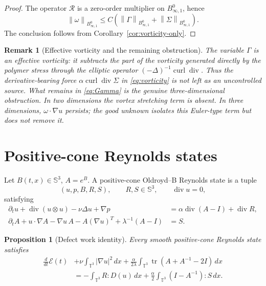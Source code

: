\documentclass[11pt]{article}
\numberwithin{equation}{section}
\newtheorem{proposition}[theorem]{Proposition}
\newtheorem{remark}[theorem]{Remark}
\newcommand{\T}{\mathbb T}
\newcommand{\Id}{I}
\newcommand{\Sym}{\mathbb S}
\newcommand{\tr}{\operatorname{tr}}
\newcommand{\divv}{\operatorname{div}}
\newcommand{\curl}{\operatorname{curl}}
\newcommand{\Besov}{B^0_{\infty,1}}
\newcommand{\calE}{\mathcal E}
\newcommand{\calR}{\mathcal R}
\newcommand{\norm}[1]{\left\lVert #1\right\rVert}
\begin{document}
\begin{proof}
The operator \(\calR\) is a zero-order multiplier on \(B^0_{\infty,1}\), hence
\[
  \norm{\omega}_{\Besov}
  \le C(\norm{\Gamma}_{\Besov}+\norm{\Sigma}_{\Besov}).
\]
The conclusion follows from Corollary~\ref{cor:vorticity-only}.
\end{proof}

\begin{remark}[Effective vorticity and the remaining obstruction]
The variable \(\Gamma\) is an effective vorticity: it subtracts the part of the
vorticity generated directly by the polymer stress through the elliptic
operator \((-\Delta)^{-1}\curl\divv\).  Thus the derivative-bearing force
\(\alpha\curl\divv\Sigma\) in \eqref{eq:vorticity} is not left as an
uncontrolled source.  What remains in \eqref{eq:Gamma} is the genuine
three-dimensional obstruction.  In two dimensions the vortex stretching term is
absent.  In three dimensions, \(\omega\cdot\nabla u\) persists; the good
unknown isolates this Euler-type term but does not remove it.
\end{remark}

\section{Positive-cone Reynolds states}

Let \(B(t,x)\in\Sym^3\), \(A=e^B\).  A positive-cone Oldroyd--B Reynolds state
is a tuple
\[
  (u,p,B,R,S),\qquad R,S\in\Sym^3,\qquad \divv u=0,
\]
satisfying
\begin{align}
  \partial_t u+\divv(u\otimes u)-\nu\Delta u+\nabla p
  &=
  \alpha\divv(A-\Id)+\divv R,
  \label{eq:reynolds-momentum}\\
  \partial_t A+u\cdot\nabla A-\nabla u\,A-A(\nabla u)^T+\lambda^{-1}(A-\Id)
  &=S .
  \label{eq:reynolds-conf}
\end{align}

\begin{proposition}[Defect work identity]
\label{prop:defect-work}
Every smooth positive-cone Reynolds state satisfies
\begin{equation}
\begin{aligned}
  \frac{d}{dt}\calE(t)
  &+\nu\int_{\T^3}|\nabla u|^2\,dx
  +\frac{\alpha}{2\lambda}
  \int_{\T^3}\tr(A+A^{-1}-2\Id)\,dx\\
  &=
  -\int_{\T^3}R:D(u)\,dx
  +\frac{\alpha}{2}\int_{\T^3}(\Id-A^{-1}):S\,dx .
\end{aligned}
  \label{eq:defect-work}
\end{equation}
\end{proposition}
\end{document}
